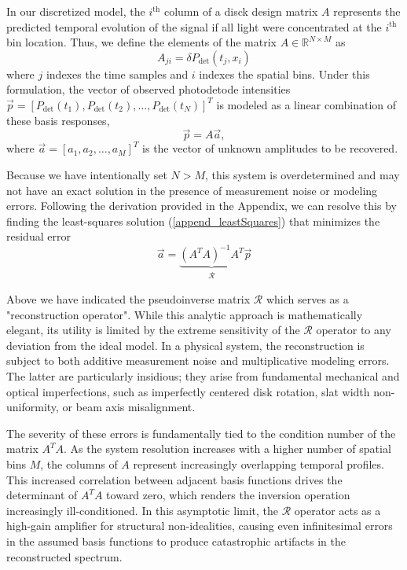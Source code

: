 \documentclass[8pt,a4paper]{report}
\begin{document}
	In our discretized model, the $i^\mathrm{th}$ column of a disck design matrix $A$ represents the predicted temporal evolution of the signal if all light were concentrated at the $i^\mathrm{th}$ bin location. Thus, we define the elements of the matrix $A \in \mathbb{R}^{N \times M}$ as
	\begin{equation}
		A_{ji} = \delta P_\mathrm{det}(t_j, x_i)
	\end{equation}
	where $j$ indexes the time samples and $i$ indexes the spatial bins. Under this formulation, the vector of observed photodetode intensities $\vec{p} = [P_\mathrm{det}(t_1), P_\mathrm{det}(t_2), \ldots, P_\mathrm{det}(t_N)]^T$ is modeled as a linear combination of these basis responses,
	\begin{equation}
		\vec{p} = A\vec{a},
	\end{equation}
	where $\vec{a} = [a_1, a_2, \ldots, a_M]^T$ is the vector of unknown amplitudes to be recovered.
	
	Because we have intentionally set $N > M$, this system is overdetermined and may not have an exact solution in the presence of measurement noise or modeling errors. Following the derivation provided in the Appendix, we can resolve this by finding the least-squares solution (\ref{append_leastSquares}) that minimizes the residual error
	\begin{equation}
		\vec{a} = \underbrace{(A^T A)^{-1} A^T}_{\begin{matrix} \mathcal{R} \end{matrix}} \vec{p}
	\end{equation}
	
	
	Above we have indicated the pseudoinverse matrix $\mathcal{R}$ which serves as a "reconstruction operator". While this analytic approach is mathematically elegant, its utility is limited by the extreme sensitivity of the $\mathcal{R}$ operator to any deviation from the ideal model. In a physical system, the reconstruction is subject to both additive measurement noise and multiplicative modeling errors. The latter are particularly insidious; they arise from fundamental mechanical and optical imperfections, such as imperfectly centered disk rotation, slat width non-uniformity, or beam axis misalignment.
	
	The severity of these errors is fundamentally tied to the condition number of the matrix $A^T A$. As the system resolution increases with a higher number of spatial bins $M$, the columns of $A$ represent increasingly overlapping temporal profiles. This increased correlation between adjacent basis functions drives the determinant of $A^T A$ toward zero, which renders the inversion operation increasingly ill-conditioned. In this asymptotic limit, the $\mathcal{R}$ operator acts as a high-gain amplifier for structural non-idealities, causing even infinitesimal errors in the assumed basis functions to produce catastrophic artifacts in the reconstructed spectrum.
	
\end{document}
